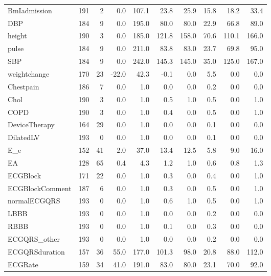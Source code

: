 \begin{footnotesize}
\begin{tabularx}{\textwidth}{P{2.4cm}RRRRRRRRR}
BmIadmission & 191 &   2 &   0.0 &   107.1 &   23.8 &   25.9 &   15.8 &  18.2 &   33.4 \\ 
DBP & 184 &   9 &   0.0 &   195.0 &   80.0 &   80.0 &   22.9 &  66.8 &   89.0 \\ 
height & 190 &   3 &   0.0 &   185.0 &  121.8 &  158.0 &   70.6 & 110.1 &  166.0 \\ 
pulse & 184 &   9 &   0.0 &   211.0 &   83.8 &   83.0 &   23.7 &  69.8 &   95.0 \\ 
SBP & 184 &   9 &   0.0 &   242.0 &  145.3 &  145.0 &   35.0 & 125.0 &  167.0 \\ 
weightchange & 170 &  23 & -22.0 &    42.3 &   -0.1 &    0.0 &    5.5 &   0.0 &    0.0 \\ 
Chestpain & 186 &   7 &   0.0 &     1.0 &    0.0 &    0.0 &    0.2 &   0.0 &    0.0 \\ 
Chol & 190 &   3 &   0.0 &     1.0 &    0.5 &    1.0 &    0.5 &   0.0 &    1.0 \\ 
COPD & 190 &   3 &   0.0 &     1.0 &    0.4 &    0.0 &    0.5 &   0.0 &    1.0 \\ 
DeviceTherapy & 164 &  29 &   0.0 &     1.0 &    0.0 &    0.0 &    0.1 &   0.0 &    0.0 \\ 
DilatedLV & 193 &   0 &   0.0 &     1.0 &    0.0 &    0.0 &    0.1 &   0.0 &    0.0 \\ 
E\_e & 152 &  41 &   2.0 &    37.0 &   13.4 &   12.5 &    5.8 &   9.0 &   16.0 \\ 
EA & 128 &  65 &   0.4 &     4.3 &    1.2 &    1.0 &    0.6 &   0.8 &    1.3 \\ 
ECGBlock & 171 &  22 &   0.0 &     1.0 &    0.3 &    0.0 &    0.4 &   0.0 &    1.0 \\ 
ECGBlockComment & 187 &   6 &   0.0 &     1.0 &    0.3 &    0.0 &    0.5 &   0.0 &    1.0 \\ 
normalECGQRS & 193 &   0 &   0.0 &     1.0 &    0.6 &    1.0 &    0.5 &   0.0 &    1.0 \\ 
LBBB & 193 &   0 &   0.0 &     1.0 &    0.0 &    0.0 &    0.2 &   0.0 &    0.0 \\ 
RBBB & 193 &   0 &   0.0 &     1.0 &    0.1 &    0.0 &    0.3 &   0.0 &    0.0 \\ 
ECGQRS\_other & 193 &   0 &   0.0 &     1.0 &    0.0 &    0.0 &    0.2 &   0.0 &    0.0 \\ 
ECGQRSduration & 157 &  36 &  55.0 &   177.0 &  101.3 &   98.0 &   20.8 &  88.0 &  112.0 \\ 
ECGRate & 159 &  34 &  41.0 &   191.0 &   83.0 &   80.0 &   23.1 &  70.0 &   92.0 \\ 

\end{tabularx}
\end{footnotesize}
